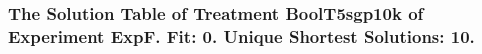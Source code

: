  \begin{frame}
 \fontsize{8pt}{9pt}\selectfont
 \frametitle{ The Solution Table of Treatment BoolT5sgp10k of Experiment ExpF. Fit: 0. Unique Shortest Solutions: 10. }

 \label{ExpFSolutionTable000.tex}  
 \end{frame}

